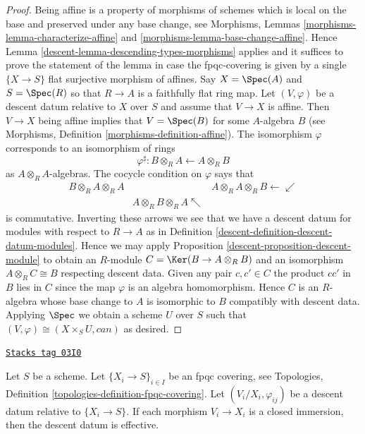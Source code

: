 \begin{proof}

Being affine is a property of morphisms of schemes
which is local on the base and preserved under any base change, see
Morphisms, Lemmas \ref{morphisms-lemma-characterize-affine} and
\ref{morphisms-lemma-base-change-affine}.
Hence Lemma \ref{descent-lemma-descending-types-morphisms} applies
and it suffices to prove the statement of the lemma
in case the fpqc-covering is given by a single
$\{X \to S\}$ flat surjective morphism of affines.
Say $X = \Spec(A)$ and $S = \Spec(R)$ so
that $R \to A$ is a faithfully flat ring map.
Let $(V, \varphi)$ be a descent datum relative to $X$ over $S$
and assume that $V \to X$ is affine.
Then $V \to X$ being affine implies that $V = \Spec(B)$
for some $A$-algebra $B$ (see
Morphisms, Definition \ref{morphisms-definition-affine}).
The isomorphism $\varphi$ corresponds to an isomorphism
of rings
$$
\varphi^\sharp :
B \otimes_R A \longleftarrow A \otimes_R B
$$
as $A \otimes_R A$-algebras. The cocycle condition on $\varphi$
says that
$$
\begin{array}{ccc}B \otimes_R A \otimes_R A &  & A \otimes_R A \otimes_R B \longleftarrow\swarrow \\  & A \otimes_R B \otimes_R A \nwarrow & \end{array}
$$
is commutative. Inverting these arrows we see that we have a
descent datum for modules with respect to $R \to A$ as in
Definition \ref{descent-definition-descent-datum-modules}.
Hence we may apply Proposition \ref{descent-proposition-descent-module}
to obtain an $R$-module
$C = \Ker(B \to A \otimes_R B)$
and an isomorphism $A \otimes_R C \cong B$
respecting descent data. Given any pair $c, c' \in C$
the product $cc'$ in $B$ lies in $C$ since the
map $\varphi$ is an algebra homomorphism. Hence
$C$ is an $R$-algebra whose base change to $A$ is
isomorphic to $B$ compatibly with descent data.
Applying $\Spec$ we obtain a scheme
$U$ over $S$ such that $(V, \varphi) \cong (X \times_S U, can)$
as desired.
\end{proof}

\begin{lemma}
\label{descent-lemma-closed-immersion}
\href{https://stacks.math.columbia.edu/tag/03I0}{\texttt{Stacks tag 03I0}}

Let $S$ be a scheme.
Let $\{X_i \to S\}_{i\in I}$ be an fpqc covering, see
Topologies, Definition \ref{topologies-definition-fpqc-covering}.
Let $(V_i/X_i, \varphi_{ij})$ be a descent datum
relative to $\{X_i \to S\}$. If each morphism
$V_i \to X_i$ is a closed immersion, then the descent datum is
effective.
\end{lemma}

